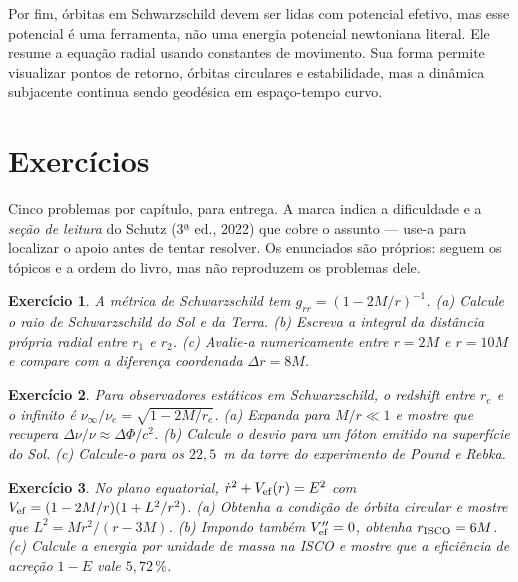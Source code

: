\documentclass[12pt,a4paper,oneside]{book}
\theoremstyle{rgplain}
\newtheorem{exercise}{Exercício}[chapter]
\theoremstyle{rgremark}
\begin{document}
Por fim, órbitas em Schwarzschild devem ser lidas com potencial efetivo, mas
esse potencial é uma ferramenta, não uma energia potencial newtoniana literal.
Ele resume a equação radial usando constantes de movimento. Sua forma permite
visualizar pontos de retorno, órbitas circulares e estabilidade, mas a dinâmica
subjacente continua sendo geodésica em espaço-tempo curvo.

\clearpage


\clearpage
\section{Exercícios}
\begin{leitura}
Cinco problemas por capítulo, para entrega. A marca indica a dificuldade e a \emph{seção de leitura} do Schutz (3ª ed., 2022) que cobre o assunto --- use-a para localizar o apoio antes de tentar resolver. Os enunciados são próprios: seguem os tópicos e a ordem do livro, mas não reproduzem os problemas dele.
\end{leitura}

\begin{exercise}
A métrica de Schwarzschild tem $g_{rr}=(1-2M/r)^{-1}$. (a) Calcule o raio de
Schwarzschild do Sol e da Terra. (b) Escreva a integral da distância própria
radial entre $r_1$ e $r_2$. (c) Avalie-a numericamente entre $r=2M$ e
$r=10M$ e compare com a diferença coordenada $\Delta r=8M$.
\end{exercise}

\begin{exercise}
Para observadores estáticos em Schwarzschild, o redshift entre $r_e$ e o
infinito é $\nu_\infty/\nu_e=\sqrt{1-2M/r_e}$. (a) Expanda para
$M/r\ll1$ e mostre que recupera $\Delta\nu/\nu\approx\Delta\Phi/c^2$.
(b) Calcule o desvio para um fóton emitido na superfície do Sol.
(c) Calcule-o para os $22{,}5$~m da torre do experimento de Pound e Rebka.
\end{exercise}

\begin{exercise}
No plano equatorial, $\dot r^2+V_{\mathrm{ef}}(r)=E^2$ com
$V_{\mathrm{ef}}=(1-2M/r)(1+L^2/r^2)$. (a) Obtenha a condição de órbita circular e
mostre que $L^2=Mr^2/(r-3M)$. (b) Impondo também $V_{\mathrm{ef}}''=0$, obtenha
$r_{\rm ISCO}=6M$. (c) Calcule a energia por unidade de massa na ISCO e mostre
que a eficiência de acreção $1-E$ vale $5{,}72\,\%$.
\end{exercise}
\end{document}
